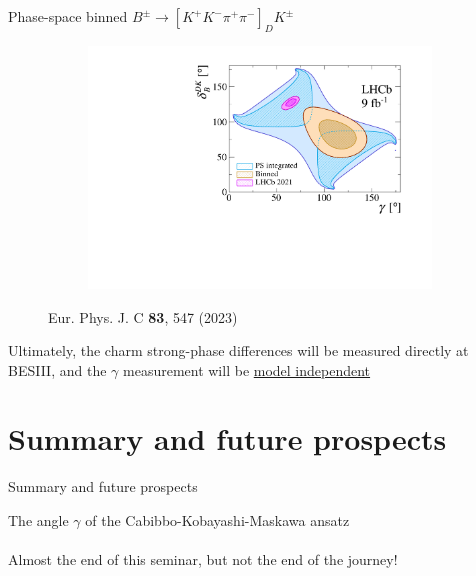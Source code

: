 \documentclass[dvipsnames]{beamer}
\begin{document}
\begin{frame}{Phase-space binned $B^\pm\to[K^+K^-\pi^+\pi^-]_DK^\pm$}
\begin{figure}[htb]
\begin{subfigure}{0.5\textwidth}
      \includegraphics[width=1\textwidth]{Plots/gammacharm_lhcb_KKpipi_GLW_KKpipi_GGSZ_lhcb_2020_beauty_and_charm_g_d_dk.pdf}
    \end{subfigure}
    \vspace{-0.5cm}
    \caption*{\tiny Eur. Phys. J. C \textbf{83}, 547 (2023)}
  \end{figure}
  \vspace{-0.5cm}
  \begin{center}
    {\large Ultimately, the charm strong-phase differences will be measured directly at BESIII, and the $\gamma$ measurement will be \underline{model independent}}
  \end{center}
\end{frame}

\section{Summary and future prospects}
\begin{frame}{Summary and future prospects}
  \begin{center}
    {\huge The angle $\gamma$ of the Cabibbo-Kobayashi-Maskawa ansatz} \\~\\
    {\large Almost the end of this seminar, but not the end of the journey!}
  \end{center}
\end{frame}
\end{document}
